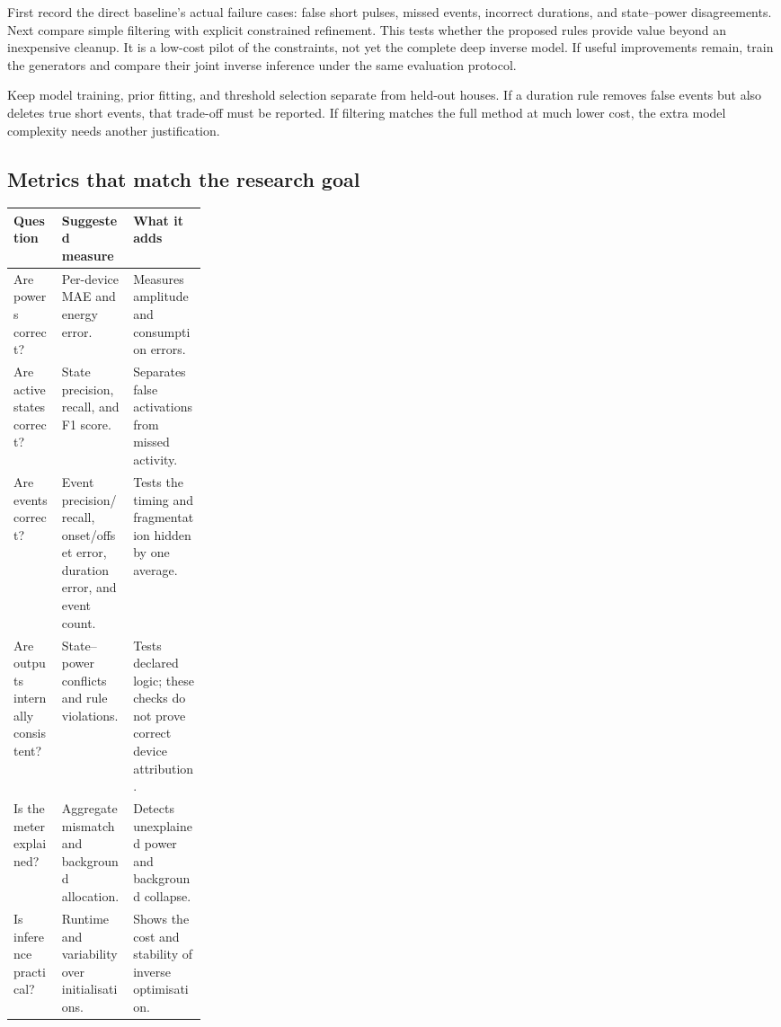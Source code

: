 \documentclass[11pt]{article}
\begin{document}
First record the direct baseline's actual failure cases: false short pulses, missed events, incorrect durations, and state--power disagreements. Next compare simple filtering with explicit constrained refinement. This tests whether the proposed rules provide value beyond an inexpensive cleanup. It is a low-cost pilot of the constraints, not yet the complete deep inverse model. If useful improvements remain, train the generators and compare their joint inverse inference under the same evaluation protocol.

Keep model training, prior fitting, and threshold selection separate from held-out houses. If a duration rule removes false events but also deletes true short events, that trade-off must be reported. If filtering matches the full method at much lower cost, the extra model complexity needs another justification.

\subsection{Metrics that match the research goal}

\begin{center}
\small
\begin{tabularx}{\linewidth}{@{}p{0.25\linewidth}YY@{}}
\toprule
Question & Suggested measure & What it adds \\
\midrule
Are powers correct? & Per-device MAE and energy error. & Measures amplitude and consumption errors. \\
Are active states correct? & State precision, recall, and F1 score. & Separates false activations from missed activity. \\
Are events correct? & Event precision/recall, onset/offset error, duration error, and event count. & Tests the timing and fragmentation hidden by one average. \\
Are outputs internally consistent? & State--power conflicts and rule violations. & Tests declared logic; these checks do not prove correct device attribution. \\
Is the meter explained? & Aggregate mismatch and background allocation. & Detects unexplained power and background collapse. \\
Is inference practical? & Runtime and variability over initialisations. & Shows the cost and stability of inverse optimisation. \\
\bottomrule
\end{tabularx}
\end{center}
\end{document}

